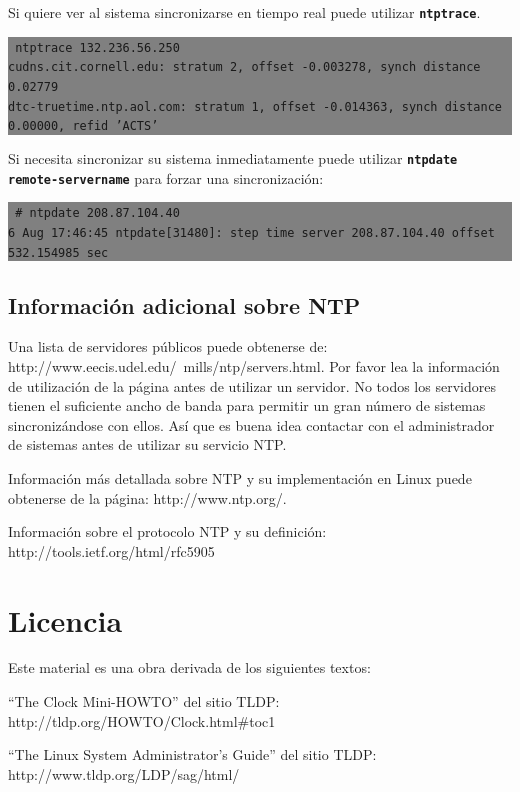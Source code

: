 \documentclass[12pt]{article}
\begin{document}
Si quiere ver al sistema sincronizarse en tiempo real puede utilizar 
\texttt{\textbf{ntptrace}}.

\colorbox{grey}{\parbox[t]{0.95\linewidth}{ \vspace*{0.5cm} {\tt 
ntptrace 132.236.56.250 \\
cudns.cit.cornell.edu: stratum 2, offset -0.003278, synch distance 0.02779 \\
dtc-truetime.ntp.aol.com: stratum 1, offset -0.014363, synch distance 0.00000, refid 'ACTS'  \\
} \vspace*{0.5cm} } } 

Si necesita sincronizar su sistema inmediatamente puede utilizar
\texttt{\textbf{ntpdate remote-servername}} para forzar una sincronización: 

\colorbox{grey}{\parbox[t]{0.95\linewidth}{ \vspace*{0.5cm} {\tt
\# ntpdate 208.87.104.40 \\
 6 Aug 17:46:45 ntpdate[31480]: step time server 208.87.104.40 offset 532.154985 sec \\
} \vspace*{0.5cm} } } 


\subsection*{Información adicional sobre NTP}

Una lista de servidores públicos puede obtenerse de:
http://www.eecis.udel.edu/~mills/ntp/servers.html. Por favor lea la
información de utilización de la página antes de utilizar un servidor. No 
todos los servidores tienen el suficiente ancho de banda para permitir 
un gran número de sistemas sincronizándose con ellos. Así que es buena 
idea contactar con el administrador de sistemas antes de utilizar su 
servicio NTP.

Información más detallada sobre NTP y su implementación en Linux 
puede obtenerse de la página: http://www.ntp.org/. 

Información sobre el protocolo NTP y su definición: http://tools.ietf.org/html/rfc5905


\section*{Licencia}

Este material es una obra derivada de los siguientes textos:

``The Clock Mini-HOWTO'' del sitio TLDP: http://tldp.org/HOWTO/Clock.html\#toc1

``The Linux System Administrator's Guide'' del sitio TLDP: http://www.tldp.org/LDP/sag/html/
\end{document}
